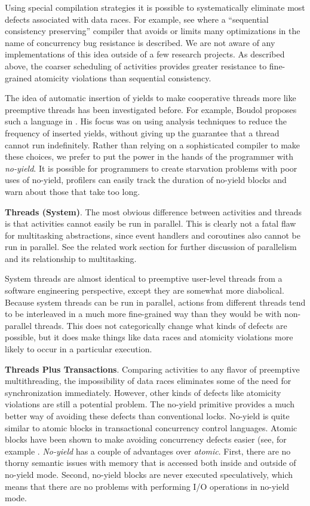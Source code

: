 \documentclass[9pt,preprint]{sigplanconf}
\begin{document}
Using special compilation strategies it is possible to systematically eliminate most defects associated with data races.
For example, see \cite{Singh2012} where a ``sequential consistency preserving'' compiler that avoids or limits many optimizations in the name of concurrency bug resistance is described.
We are not aware of any implementations of this idea outside of a few research projects.
As described above, the coarser scheduling of activities provides greater resistance to fine-grained atomicity violations than sequential consistency.

The idea of automatic insertion of yields to make cooperative threads more like preemptive threads has been investigated before.
For example, Boudol proposes such a language in \cite{Boudol2007}.
His focus was on using analysis techniques to reduce the frequency of inserted yields, without giving up the guarantee that a thread cannot run indefinitely.
Rather than relying on a sophisticated compiler to make these choices, we prefer to put the power in the hands of the programmer with \emph{no-yield}.
It is possible for programmers to create starvation problems with poor uses of no-yield, profilers can easily track the duration of no-yield blocks and warn about those that take too long.

\textbf{Threads (System)}.
The most obvious difference between activities and threads is that activities cannot easily be run in parallel.
This is clearly not a fatal flaw for multitasking abstractions, since event handlers and coroutines also cannot be run in parallel.
See the related work section for further discussion of parallelism and its relationship to multitasking.

System threads are almost identical to preemptive user-level threads from a software engineering perspective, except they are somewhat more diabolical.
Because system threads can be run in parallel, actions from different threads tend to be interleaved in a much more fine-grained way than they would be with non-parallel threads.
This does not categorically change what kinds of defects are possible, but it does make things like data races and atomicity violations more likely to occur in a particular execution.

\textbf{Threads Plus Transactions}.
Comparing activities to any flavor of preemptive multithreading, the impossibility of data races eliminates some of the need for synchronization immediately.
However, other kinds of defects like atomicity violations are still a potential problem.
The no-yield primitive provides a much better way of avoiding these defects than conventional locks.
No-yield is quite similar to atomic blocks in transactional concurrency control languages.
Atomic blocks have been shown to make avoiding concurrency defects easier (see, for example \cite{Harris2005, Grossman2007}.
\emph{No-yield} has a couple of advantages over \emph{atomic}.
First, there are no thorny semantic issues with memory that is accessed both inside and outside of no-yield mode.
Second, no-yield blocks are never executed speculatively, which means that there are no problems with performing I/O operations in no-yield mode.
\end{document}
